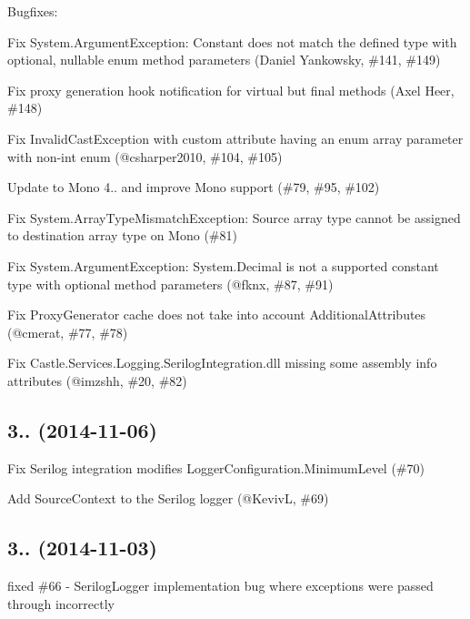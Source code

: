 Bugfixes\+:
\begin{DoxyItemize}
\item Fix \textquotesingle{}System.\+Argument\+Exception\+: Constant does not match the defined type\textquotesingle{} with optional, nullable enum method parameters (Daniel Yankowsky, \#141, \#149)
\item Fix proxy generation hook notification for virtual but final methods (Axel Heer, \#148)
\item Fix Invalid\+Cast\+Exception with custom attribute having an enum array parameter with non-\/int enum (@csharper2010, \#104, \#105)
\item Update to Mono 4.. and improve Mono support (\#79, \#95, \#102)
\item Fix \textquotesingle{}System.\+Array\+Type\+Mismatch\+Exception\+: Source array type cannot be assigned to destination array type\textquotesingle{} on Mono (\#81)
\item Fix \textquotesingle{}System.\+Argument\+Exception\+: System.\+Decimal is not a supported constant type\textquotesingle{} with optional method parameters (@fknx, \#87, \#91)
\item Fix Proxy\+Generator cache does not take into account Additional\+Attributes (@cmerat, \#77, \#78)
\item Fix Castle.\+Services.\+Logging.\+Serilog\+Integration.\+dll missing some assembly info attributes (@imzshh, \#20, \#82)
\end{DoxyItemize}

\subsection*{3.. (2014-\/11-\/06)}


\begin{DoxyItemize}
\item Fix Serilog integration modifies Logger\+Configuration.\+Minimum\+Level (\#70)
\item Add Source\+Context to the Serilog logger (@\+KevivL, \#69)
\end{DoxyItemize}

\subsection*{3.. (2014-\/11-\/03)}


\begin{DoxyItemize}
\item fixed \#66 -\/ Serilog\+Logger implementation bug where exceptions were passed through incorrectly
\end{DoxyItemize}

